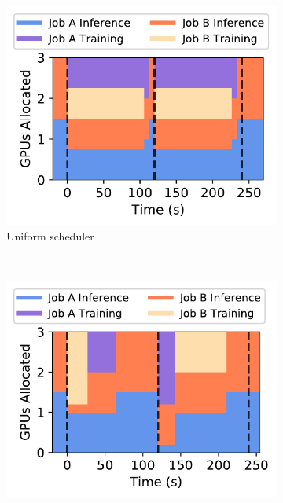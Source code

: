 \begin{figure}[t!]
  \centering
    \begin{subfigure}[t]{0.47\columnwidth}
    \centering
    \includegraphics[width=\linewidth]{ekya/figures/motivation/Scheduler/schedmot_res_eventual_best_cfgs.pdf}
    \caption{Uniform scheduler}
    \label{fig:schedmot-res-naive}
  \end{subfigure}  
  ~~
  \begin{subfigure}[t]{0.47\columnwidth}
    \centering
    \includegraphics[width=\linewidth]{ekya/figures/motivation/Scheduler/schedmot_res_prioritization_and_optimal_cfgs.pdf}

\end{subfigure}
\end{figure}
